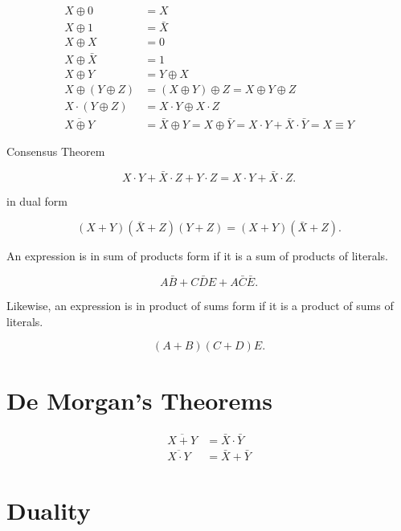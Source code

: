 \documentclass{report}
\begin{document}
\begin{align*}
	X\oplus 0            & = X                                                                               \\
	X\oplus 1            & = \bar{X}                                                                         \\
	X\oplus X            & = 0                                                                               \\
	X\oplus \bar{X}      & = 1                                                                               \\
	X\oplus Y            & = Y\oplus X                                                                       \\
	X\oplus (Y\oplus Z)  & = (X\oplus Y)\oplus Z = X\oplus Y\oplus Z                                         \\
	X\cdot (Y\oplus Z)   & = X\cdot Y\oplus X\cdot Z                                                         \\
	\overline{X\oplus Y} & = \bar{X}\oplus Y = X\oplus \bar{Y} = X\cdot Y + \bar{X}\cdot \bar{Y} = X\equiv Y
\end{align*}

Consensus Theorem

\[
	X\cdot Y + \bar{X}\cdot Z + Y\cdot Z = X\cdot Y + \bar{X}\cdot Z
	.\]

in dual form

\[
	(X + Y)(\bar{X} + Z)(Y + Z) = (X + Y)(\bar{X} + Z)
	.\]


An expression is in sum of products form if it is a sum of products of literals.

\[
	A\bar{B} + C\bar{D}E + A\bar{C}\bar{E}
	.\]

Likewise, an expression is in product of sums form if it is a product of sums of literals.

\[
	(A + B)(C + D)E
	.\]

\section{De Morgan's Theorems}

\begin{align*}
	\overline{X + Y}     & = \bar{X} \cdot \bar{Y} \\
	\overline{X \cdot Y} & = \bar{X} + \bar{Y}
\end{align*}

\section{Duality}
\end{document}
